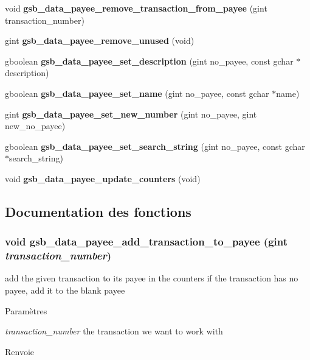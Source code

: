 \begin{DoxyCompactItemize}
void {\bf gsb\_\-data\_\-payee\_\-remove\_\-transaction\_\-from\_\-payee} (gint transaction\_\-number)
\item 
gint {\bf gsb\_\-data\_\-payee\_\-remove\_\-unused} (void)
\item 
gboolean {\bf gsb\_\-data\_\-payee\_\-set\_\-description} (gint no\_\-payee, const gchar $\ast$description)
\item 
gboolean {\bf gsb\_\-data\_\-payee\_\-set\_\-name} (gint no\_\-payee, const gchar $\ast$name)
\item 
gint {\bf gsb\_\-data\_\-payee\_\-set\_\-new\_\-number} (gint no\_\-payee, gint new\_\-no\_\-payee)
\item 
gboolean {\bf gsb\_\-data\_\-payee\_\-set\_\-search\_\-string} (gint no\_\-payee, const gchar $\ast$search\_\-string)
\item 
void {\bf gsb\_\-data\_\-payee\_\-update\_\-counters} (void)
\end{DoxyCompactItemize}


\subsection{Documentation des fonctions}
\subsubsection[{gsb\_\-data\_\-payee\_\-add\_\-transaction\_\-to\_\-payee}]{\setlength{\rightskip}{0pt plus 5cm}void gsb\_\-data\_\-payee\_\-add\_\-transaction\_\-to\_\-payee (gint {\em transaction\_\-number})}\label{gsb__data__payee_8h_ae57cf148af34346fc3d49bd1f313081d}
add the given transaction to its payee in the counters if the transaction has no payee, add it to the blank payee


\begin{DoxyParams}{Paramètres}
\item[{\em transaction\_\-number}]the transaction we want to work with\end{DoxyParams}
\begin{DoxyReturn}{Renvoie}

\end{DoxyReturn}


